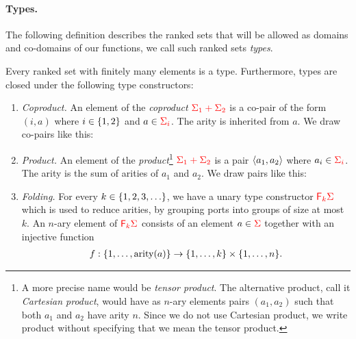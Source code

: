 \paragraph*{Types.} The following definition describes the  ranked sets that will be allowed as domains and co-domains of our functions, we call such ranked sets \emph{types}.



\begin{definition}[Types] \label{def:types} Every  ranked set with finitely many elements is a type. Furthermore, types are closed under the following type constructors:
    \begin{enumerate}
       \item \emph{Coproduct.} An element of the \emph{coproduct} ${\color{red}{\Sigma_1 + \Sigma_2}}$ is a co-pair of the form  $(i,a)$ where $i \in \{1,2\}$ and $a \in {\color{red}{\Sigma_i}}$. The arity is inherited from $a$. We draw co-pairs like this:
              \item       \emph{Product.} An element of the   \emph{product}\footnote{
                  A more precise name would be \emph{tensor product}. The alternative product, call it \emph{Cartesian product}, would have as $n$-ary elements  pairs $(a_1,a_2)$ such that both $a_1$ and $a_2$ have arity $n$. Since we do not use Cartesian product, we write product without specifying that we mean the tensor product.
              } ${\color{red}{\Sigma_1 + \Sigma_2}}$  is a  pair $\langle{a_1,a_2}\rangle$ where $a_i \in {\color{red}{\Sigma_i}}$. The arity   is the sum of arities of $a_1$ and $a_2$. We draw pairs like this:
        \item \emph{Folding.} For every $k \in \{1,2,3,\ldots\}$, we have a unary type constructor ${\color{red}{\mathsf F_{k}}}{\color{red}{\Sigma}}$  which is used to reduce arities, by grouping ports into groups of size at most $k$.  An $n$-ary element of ${\color{red}{\mathsf F_{k}}}{\color{red}{\Sigma}}$ consists of an element      $a \in {\color{red}{\Sigma}}$  together with an  injective  function
            \begin{align*}
                f : \set{1,\ldots,\arity a} \to \set{1,\ldots,k} \times  \set{1,\ldots,n}.

\end{align*}
\end{enumerate}
\end{definition}
